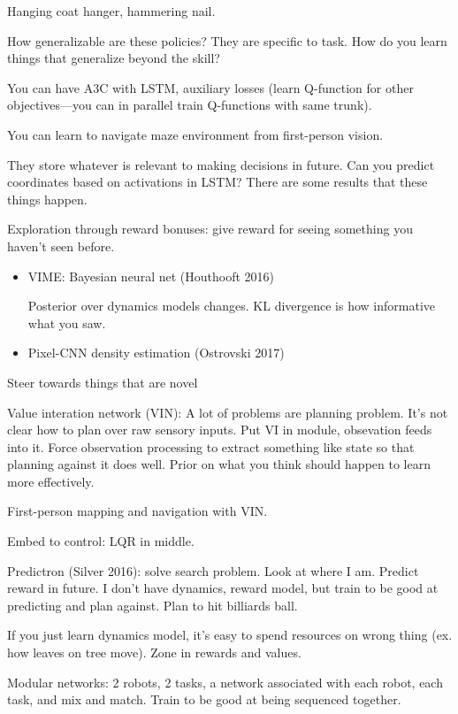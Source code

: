 Hanging coat hanger, hammering nail.

How generalizable are these policies? They are specific to task. How do you learn things that generalize beyond the skill?

You can have A3C with LSTM, auxiliary losses (learn Q-function for other objectives---you can in parallel train Q-functions with same trunk). 

You can learn to navigate maze environment from first-person vision.

They store whatever is relevant to making decisions in future. Can you predict coordinates based on activations in LSTM? There are some results that these things happen.


Exploration through reward bonuses: give reward for seeing something you haven't seen before.
\begin{itemize}
\item
VIME: Bayesian neural net (Houthooft 2016)

Posterior over dynamics models changes. KL divergence is how informative what you saw.
\item Pixel-CNN density estimation (Ostrovski 2017)
\end{itemize}

Steer towards things that are novel

Value interation network (VIN): A lot of problems are planning problem. It's not clear how to plan over raw sensory inputs. Put VI in module, obsevation feeds into it. Force observation processing to extract something like state so that planning against it does well. 
Prior on what you think should happen to learn more effectively.

First-person mapping and navigation with VIN.

Embed to control: LQR in middle.

Predictron (Silver 2016): solve search problem. Look at where I am. Predict reward in future. I don't have dynamics, reward model, but train to be good at predicting and plan against. Plan to hit billiards ball.

If you just learn dynamics model, it's easy to spend resources on wrong thing (ex. how leaves on tree move). Zone in rewards and values.

Modular networks: 2 robots, 2 tasks, a network associated with each robot, each task, and mix and match. Train to be good at being sequenced together.

